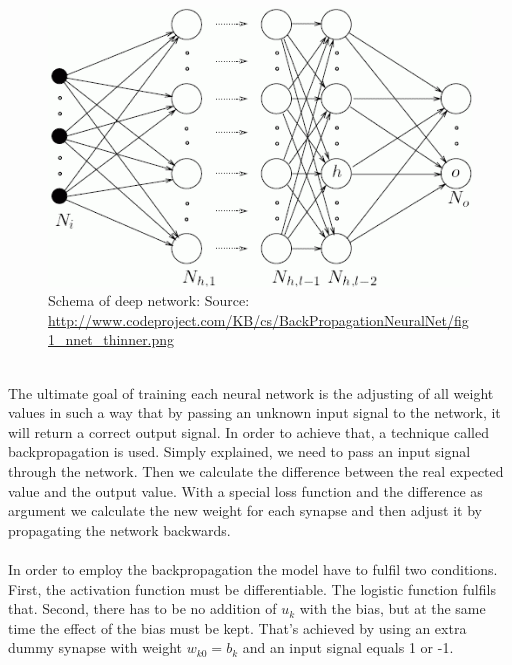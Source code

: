\documentclass[runningheads,a4paper]{llncs}[2015/06/24]
\begin{document}
\begin{figure}[h]
\centering
\includegraphics[width=\textwidth]{deepNetwork}
\caption{Schema of deep network: Source: \url{http://www.codeproject.com/KB/cs/BackPropagationNeuralNet/fig1_nnet_thinner.png}}
\label{fig:deepNetwork}
\end{figure}  
  
\hspace{1cm}\\ The ultimate goal of training each neural network is the adjusting of all weight values in such a way that by passing an unknown input signal to the network, it will return a correct output signal. In order to achieve that, a technique called backpropagation is used. Simply explained, we need to pass an input signal through the network. Then we calculate the difference between the real expected value and the output value. With a special loss function and the difference as argument we calculate the new weight for each synapse and then adjust it by propagating the network backwards\cite{rumelhart1986learning}.\\\\ In order to employ the backpropagation the model have to fulfil two conditions. First, the activation function must be differentiable. The logistic function fulfils that. Second, there has to be no addition of $u_k$ with the bias, but at the same time the effect of the bias must be kept. That's achieved by using an extra dummy synapse with weight $w_{k0} = b_k$ and an input signal equals 1 or -1\cite{haykin2009neural}.
\end{document}

